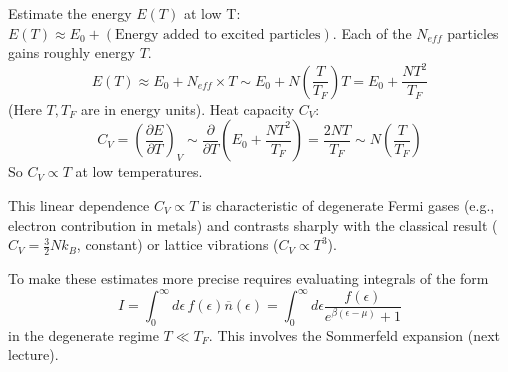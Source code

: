 \documentclass[11pt]{article}
\newcommand{\pderiv}[2]{\frac{\partial #1}{\partial #2}}
\newcommand{\eps}{\epsilon}
\newcommand{\nbar}{\overline{n}} %
\newcommand{\tf}{T_F} %
\begin{document}
Estimate the energy $E(T)$ at low T:
$E(T) \approx E_0 + (\text{Energy added to excited particles})$.
Each of the $N_{eff}$ particles gains roughly energy $T$.
\[ E(T) \approx E_0 + N_{eff} \times T \sim E_0 + N \left( \frac{T}{\tf} \right) T = E_0 + \frac{N T^2}{\tf} \]
(Here $T, \tf$ are in energy units).
Heat capacity $C_V$:
\[ C_V = \left( \pderiv{E}{T} \right)_V \sim \pderiv{}{T} \left( E_0 + \frac{N T^2}{\tf} \right) = \frac{2N T}{\tf} \sim N \left( \frac{T}{\tf} \right) \]
So $C_V \propto T$ at low temperatures.

\begin{center}
\end{center}
This linear dependence $C_V \propto T$ is characteristic of degenerate Fermi gases (e.g., electron contribution in metals) and contrasts sharply with the classical result ($C_V = \frac{3}{2}N k_B$, constant) or lattice vibrations ($C_V \propto T^3$).

To make these estimates more precise requires evaluating integrals of the form
\[ I = \int_0^\infty d\eps \, f(\eps) \nbar(\eps) = \int_0^\infty d\eps \frac{f(\eps)}{e^{\beta(\eps-\mu)}+1} \]
in the degenerate regime $T \ll \tf$. This involves the Sommerfeld expansion (next lecture).
\end{document}
